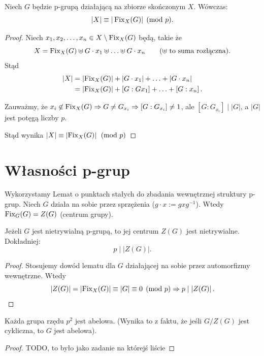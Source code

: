 \begin{lemma}
    Niech $G$ będzie p-grupą działającą na zbiorze skończonym $X$. Wówczas:
    \[
    |X| \equiv |\operatorname{Fix}_{X}(G)| \pmod{p}.
    \]
\end{lemma}  
\begin{proof}
	Niech $x_1,x_2,\ldots,x_{n}\in X\setminus \operatorname{Fix}_{X}(G)$ będą, takie że
	\[
		X = \operatorname{Fix}_{X}(G) \uplus G\cdot x_1 \uplus \ldots \uplus G\cdot x_{n}\tag{$\uplus$ to suma rozłączna}
	.\] 
	Stąd 
	 \begin{align*}
		\left| X \right| &= \left| \operatorname{Fix}_{X}(G)  \right| + \left| G\cdot x_1 \right| + \ldots + \left| G\cdot x_{n} \right|  \\
		&= \left| \operatorname{Fix}_{X}(G)  \right| + \left[ G:Gx_{1} \right] + \ldots + \left[ G:x_{n} \right] 
	.\end{align*}
	
	Zauważmy, że $x_{i}\not\in \operatorname{Fix}_{X}(G) \Rightarrow G\neq G_{x_{i}} \Rightarrow \left[ G:G_{x_{i}} \right] \neq 1$,
	ale $\left[ G:G_{x_{i}} \right] \mid \left| G \right| $, a $\left| G \right| $ jest potęgą liczby $p$.

	Stąd wynika $\left| X \right|  \equiv \left| \operatorname{Fix}_{X}(G)  \right| \pmod{p} $
\end{proof} 

\section{Własności p-grup}

Wykorzystamy Lemat o punktach stałych do zbadania wewnętrznej struktury p-grup. Niech $G$ działa na sobie przez sprzężenia ($g \cdot x := gxg^{-1}$). Wtedy $\operatorname{Fix}_G(G) = Z(G)$ (centrum grupy).

\begin{theorem}
    Jeżeli $G$ jest nietrywialną p-grupą, to jej centrum $Z(G)$ jest nietrywialne. Dokładniej:
    \[ p \mid |Z(G)|. \]
\end{theorem} 
\begin{proof}
	Stosujemy dowód lematu dla $G$ działającej na sobie przez automorfizmy wewnętrzne. Wtedy
	\[
	\left| Z(G) \right| = \left| \operatorname{Fix}_{X}(G)  \right| \equiv \left| G \right|  \equiv 0 \pmod{p} \Rightarrow p\mid \left| Z(G) \right|  
	.\] 
\end{proof} 
\begin{corollary}
    Każda grupa rzędu $p^2$ jest abelowa. (Wynika to z faktu, że jeśli $G/Z(G)$ jest cykliczna, to $G$ jest abelowa).
\end{corollary}
\begin{proof}
	TODO, to było jako zadanie na którejś liście
\end{proof} 

